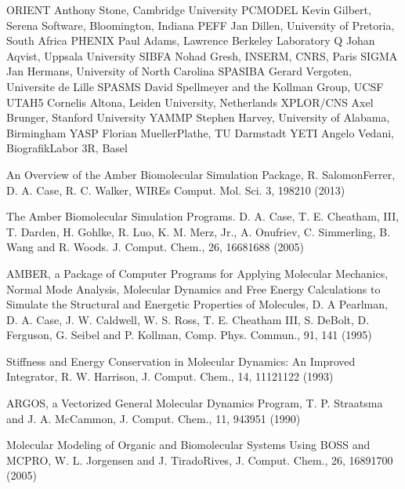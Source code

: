 \documentclass[letterpaper,11pt,english]{sphinxmanual}
\begin{document}
\begin{sphinxVerbatim}[commandchars=\\\{\}]
ORIENT         Anthony Stone, Cambridge University
PCMODEL        Kevin Gilbert, Serena Software, Bloomington, Indiana
PEFF           Jan Dillen, University of Pretoria, South Africa
PHENIX         Paul Adams, Lawrence Berkeley Laboratory
Q              Johan Aqvist, Uppsala University
SIBFA          Nohad Gresh, INSERM, CNRS, Paris
SIGMA          Jan Hermans, University of North Carolina
SPASIBA        Gerard Vergoten, Universite de Lille
SPASMS         David Spellmeyer and the Kollman Group, UCSF
UTAH5          Cornelis Altona, Leiden University, Netherlands
XPLOR/CNS      Axel Brunger, Stanford University
YAMMP          Stephen Harvey, University of Alabama, Birmingham
YASP           Florian Mueller\PYGZhy{}Plathe, TU Darmstadt
YETI           Angelo Vedani, Biografik\PYGZhy{}Labor 3R, Basel
\end{sphinxVerbatim}


An Overview of the Amber Biomolecular Simulation Package, R. Salomon\sphinxhyphen{}Ferrer, D. A. Case, R. C. Walker, WIREs Comput. Mol. Sci. 3, 198\sphinxhyphen{}210 (2013)

The Amber Biomolecular Simulation Programs. D. A. Case, T. E. Cheatham, III, T. Darden, H. Gohlke, R. Luo, K. M. Merz, Jr., A. Onufriev, C. Simmerling, B. Wang and R. Woods. J. Comput. Chem., 26, 1668\sphinxhyphen{}1688 (2005)

AMBER, a Package of Computer Programs for Applying Molecular Mechanics, Normal Mode Analysis, Molecular Dynamics and Free Energy Calculations to Simulate the Structural and Energetic Properties of Molecules, D. A Pearlman, D. A. Case, J. W. Caldwell, W. S. Ross, T. E. Cheatham III, S. DeBolt, D. Ferguson, G. Seibel and P. Kollman, Comp. Phys. Commun., 91, 1\sphinxhyphen{}41 (1995)


Stiffness and Energy Conservation in Molecular Dynamics: An Improved Integrator, R. W. Harrison, J. Comput. Chem., 14, 1112\sphinxhyphen{}1122 (1993)


ARGOS, a Vectorized General Molecular Dynamics Program, T. P. Straatsma and J. A. McCammon, J. Comput. Chem., 11, 943\sphinxhyphen{}951 (1990)


Molecular Modeling of Organic and Biomolecular Systems Using BOSS and MCPRO, W. L. Jorgensen and J. Tirado\sphinxhyphen{}Rives, J. Comput. Chem., 26, 1689\sphinxhyphen{}1700 (2005)
\end{document}
